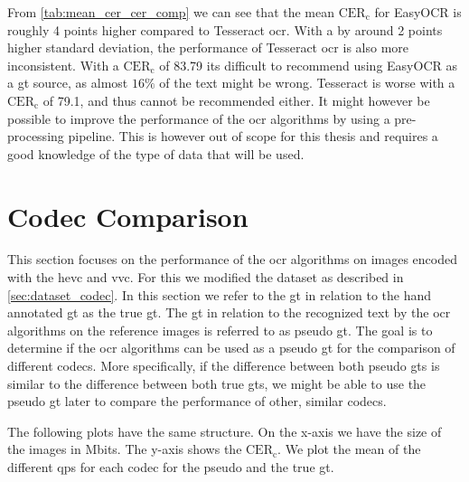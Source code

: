 From \autoref{tab:mean_cer_cer_comp} we can see that the mean $\text{CER}_{\text{c}}$ for EasyOCR is roughly 4 points higher compared to Tesseract \gls{ocr}.
With a by around 2 points higher standard deviation, the performance of Tesseract \gls{ocr} is also more inconsistent.
With a $\text{CER}_{\text{c}}$ of 83.79 its difficult to recommend using EasyOCR as a \gls{gt} source, as almost $16\%$ of the text might be wrong.
Tesseract is worse with a $\text{CER}_{\text{c}}$ of 79.1, and thus cannot be recommended either.
It might however be possible to improve the performance of the \gls{ocr} algorithms by using a pre-processing pipeline.
This is however out of scope for this thesis and requires a good knowledge of the type of data that will be used.






\section{Codec Comparison}
\label{sec:codec_comparison}

This section focuses on the performance of the \gls{ocr} algorithms on images encoded with the \gls{hevc} and \gls{vvc}.
For this we modified the dataset as described in \autoref{sec:dataset_codec}.
In this section we refer to the \gls{gt} in relation to the hand annotated \gls{gt} as the true \gls{gt}.
The \gls{gt} in relation to the recognized text by the \gls{ocr} algorithms on the reference images is referred to as pseudo \gls{gt}.
The goal is to determine if the \gls{ocr} algorithms can be used as a pseudo \gls{gt} for the comparison of different codecs.
More specifically, if the difference between both pseudo \glspl{gt} is similar to the difference between both true \glspl{gt}, we might be able to use the pseudo \gls{gt} later to compare the performance of other, similar codecs.

The following plots have the same structure.
On the x-axis we have the size of the images in Mbits.
The y-axis shows the $\text{CER}_{\text{c}}$.
We plot the mean of the different \glspl{qp} for each codec for the pseudo and the true \gls{gt}.


